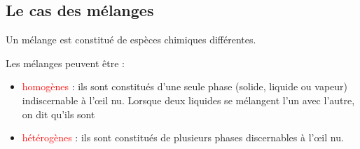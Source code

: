 


%
\subsection{Le cas des mélanges}
\begin{tcolorbox}[colback=green!5!white,colframe=green!75!black,title=\textbf{Mélange}]
Un mélange est constitué de  espèces chimiques différentes.
\end{tcolorbox}
Les mélanges peuvent être :
\begin{itemize}
    \item \textcolor{red}{homogènes} : ils sont constitués d'une seule phase (solide, liquide ou vapeur) indiscernable à l'\oe il nu. Lorsque deux liquides se mélangent l'un avec l'autre, on dit qu'ils sont %
    \item \textcolor{red}{hétérogènes} : ils sont constitués de plusieurs phases discernables à l'\oe il nu.
\end{itemize}

